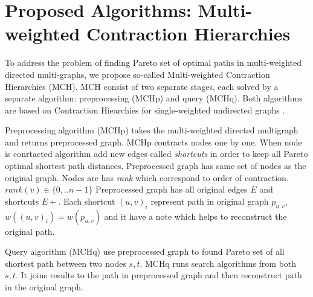 
\section{Proposed Algorithms: Multi-weighted Contraction Hierarchies}
\label{secAlgorithms}

To address the problem of finding Pareto set of optimal paths in multi-weighted directed multi-graphs, we propose so-called Multi-weighted Contraction Hierarchies (MCH). 
MCH consist of two separate stages, each solved by a separate algorithm: preprocessing (MCHp) and query (MCHq). 
Both algorithms are based on Contraction Hiearchies for single-weighted undirected graphs \cite{geisberger2008contraction}.

Preprocessing algorithm (MCHp) takes the multi-weighted directed multigraph
and returns preprocessed graph. MCHp contracts nodes one by one. 
When node is conrtacted algorithm add new edges called \emph{shortcuts} in order
to keep all Pareto optimal shortest path distances. 
Preprocessed graph has same set of nodes as the original graph.
Nodes are has \emph{rank} which correspond to order of contraction.
$rank(v) \in \{0,..n-1\}$
Preprocessed graph has all original edges $E$ and shortcuts $E+$.
Each shortcut $(u,v)_i$ represent 
path in original graph $p_{u,v}$, $w((u,v)_i) = w(p_{u,v})$ and it have a note which helps
to reconstruct the original path.

Query algorithm (MCHq) use preprocessed graph to found Pareto set of all
shortest path between two nodes $s, t$. MCHq runs search algorithms
from both $s, t$. 
It joins results to the path in preprocessed graph 
and then reconstruct path in the original graph.




